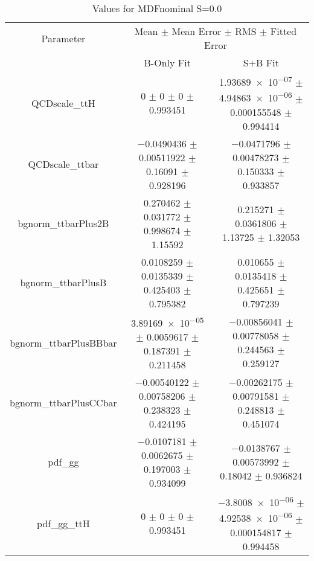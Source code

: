 \begin{table}
\centering
\caption{Values for MDFnominal S=0.0}
\begin{tabular}{ccc}
\toprule
Parameter & \multicolumn{2}{c}{Mean $\pm$ Mean Error $\pm$ RMS $\pm$ Fitted Error}\\
 & B-Only Fit & S+B Fit\\
\midrule
QCDscale\_ttH & \num{0} $\pm$ \num{0} $\pm$ \num{0} $\pm$ \num{0.993451} & \num{1.93689e-07} $\pm$ \num{4.94863e-06} $\pm$ \num{0.000155548} $\pm$ \num{0.994414}\\
QCDscale\_ttbar & \num{-0.0490436} $\pm$ \num{0.00511922} $\pm$ \num{0.16091} $\pm$ \num{0.928196} & \num{-0.0471796} $\pm$ \num{0.00478273} $\pm$ \num{0.150333} $\pm$ \num{0.933857}\\
bgnorm\_ttbarPlus2B & \num{0.270462} $\pm$ \num{0.031772} $\pm$ \num{0.998674} $\pm$ \num{1.15592} & \num{0.215271} $\pm$ \num{0.0361806} $\pm$ \num{1.13725} $\pm$ \num{1.32053}\\
bgnorm\_ttbarPlusB & \num{0.0108259} $\pm$ \num{0.0135339} $\pm$ \num{0.425403} $\pm$ \num{0.795382} & \num{0.010655} $\pm$ \num{0.0135418} $\pm$ \num{0.425651} $\pm$ \num{0.797239}\\
bgnorm\_ttbarPlusBBbar & \num{3.89169e-05} $\pm$ \num{0.0059617} $\pm$ \num{0.187391} $\pm$ \num{0.211458} & \num{-0.00856041} $\pm$ \num{0.00778058} $\pm$ \num{0.244563} $\pm$ \num{0.259127}\\
bgnorm\_ttbarPlusCCbar & \num{-0.00540122} $\pm$ \num{0.00758206} $\pm$ \num{0.238323} $\pm$ \num{0.424195} & \num{-0.00262175} $\pm$ \num{0.00791581} $\pm$ \num{0.248813} $\pm$ \num{0.451074}\\
pdf\_gg & \num{-0.0107181} $\pm$ \num{0.0062675} $\pm$ \num{0.197003} $\pm$ \num{0.934099} & \num{-0.0138767} $\pm$ \num{0.00573992} $\pm$ \num{0.18042} $\pm$ \num{0.936824}\\
pdf\_gg\_ttH & \num{0} $\pm$ \num{0} $\pm$ \num{0} $\pm$ \num{0.993451} & \num{-3.8008e-06} $\pm$ \num{4.92538e-06} $\pm$ \num{0.000154817} $\pm$ \num{0.994458}\\
\bottomrule
\end{tabular}
\end{table}